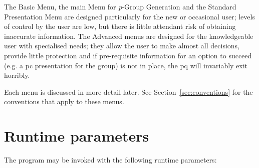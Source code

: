 \documentclass[12pt]{article}
\begin{document}
The Basic Menu, the main Menu for {\it p}-Group Generation and
the Standard Presentation Menu
are designed particularly for the new or occasional user; 
levels of control by the user are low, but there is little
attendant risk of obtaining inaccurate information. The Advanced menus
are designed for the knowledgeable user with specialised needs; they
allow the user to make almost all decisions, provide little protection
and if pre-requisite information for an option to succeed 
(e.g. a pc presentation for the group) is not in place, the pq will
invariably exit horribly.

Each menu is discussed in more detail later. See
Section~\ref{sec:conventions} for the conventions 
that apply to these menus. 

\pagebreak
\section{Runtime parameters}\label{sec:runtime}
The program may be invoked with the following runtime parameters: 
\end{document}

